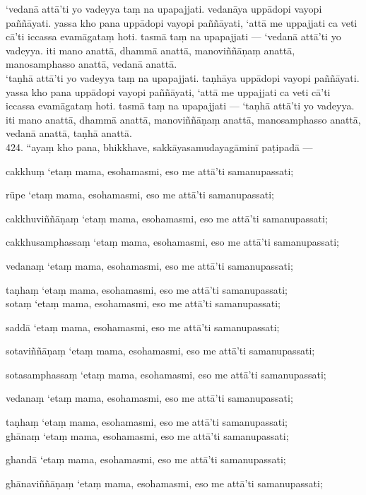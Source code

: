 \documentclass[11pt]{article}
\begin{document}
‘vedanā attā’ti yo vadeyya taṃ na upapajjati. vedanāya uppādopi vayopi paññāyati. yassa kho pana uppādopi vayopi paññāyati, ‘attā me uppajjati ca veti cā’ti iccassa evamāgataṃ hoti. tasmā taṃ na upapajjati — ‘vedanā attā’ti yo vadeyya. iti mano anattā, dhammā anattā, manoviññāṇaṃ anattā, manosamphasso anattā, vedanā anattā.\\

‘taṇhā attā’ti yo vadeyya taṃ na upapajjati. taṇhāya uppādopi vayopi paññāyati. yassa kho pana uppādopi vayopi paññāyati, ‘attā me uppajjati ca veti cā’ti iccassa evamāgataṃ hoti. tasmā taṃ na upapajjati — ‘taṇhā attā’ti yo vadeyya. iti mano anattā, dhammā anattā, manoviññāṇaṃ anattā, manosamphasso anattā, vedanā anattā, taṇhā anattā.\\

424. “ayaṃ kho pana, bhikkhave, sakkāyasamudayagāminī paṭipadā —\

cakkhuṃ ‘etaṃ mama, esohamasmi, eso me attā’ti samanupassati;\

rūpe ‘etaṃ mama, esohamasmi, eso me attā’ti samanupassati;\

cakkhuviññāṇaṃ ‘etaṃ mama, esohamasmi, eso me attā’ti samanupassati;\

cakkhusamphassaṃ ‘etaṃ mama, esohamasmi, eso me attā’ti samanupassati;\

vedanaṃ ‘etaṃ mama, esohamasmi, eso me attā’ti samanupassati;\

taṇhaṃ ‘etaṃ mama, esohamasmi, eso me attā’ti samanupassati;\\

sotaṃ ‘etaṃ mama, esohamasmi, eso me attā’ti samanupassati;\

saddā ‘etaṃ mama, esohamasmi, eso me attā’ti samanupassati;\

sotaviññāṇaṃ ‘etaṃ mama, esohamasmi, eso me attā’ti samanupassati;\

sotasamphassaṃ ‘etaṃ mama, esohamasmi, eso me attā’ti samanupassati;\

vedanaṃ ‘etaṃ mama, esohamasmi, eso me attā’ti samanupassati;\

taṇhaṃ ‘etaṃ mama, esohamasmi, eso me attā’ti samanupassati;\\

ghānaṃ ‘etaṃ mama, esohamasmi, eso me attā’ti samanupassati;\

ghandā ‘etaṃ mama, esohamasmi, eso me attā’ti samanupassati;\

ghānaviññāṇaṃ ‘etaṃ mama, esohamasmi, eso me attā’ti samanupassati;\
\end{document}
